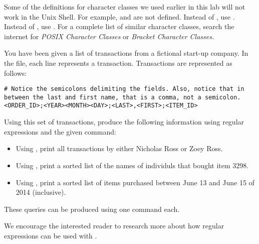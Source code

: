 \begin{warn}
Some of the definitions for character classes we used earlier in this lab will not work in the Unix Shell. For example, \li{\\w} and \li{\\d} are not defined. Instead of \li{\\w}, use \li{[[:alnum:]]}. Instead of \li{\\d}, use \li{[[:digit:]]}. For a complete list of similar character classes, search the internet for \emph{POSIX Character Classes} or \emph{Bracket Character Classes.}
\end{warn}

\begin{problem}
You have been given a list of transactions from a fictional start-up company. In the  file, each line represents a transaction. Transactions are represented as follows:
\begin{lstlisting}
# Notice the semicolons delimiting the fields. Also, notice that in between the last and first name, that is a comma, not a semicolon.
<ORDER_ID>;<YEAR><MONTH><DAY>;<LAST>,<FIRST>;<ITEM_ID>
\end{lstlisting}

Using this set of transactions, produce the following information using regular expressions and the given command:
\begin{itemize}
    \item Using , print all transactions by either Nicholas Ross or Zoey Ross.
    \item Using , print a sorted list of the names of individuls that bought item $3298$.
    \item Using , print a sorted list of items purchased between June 13 and June 15 of 2014 (inclusive).
\end{itemize}
These queries can be produced using one command each.
\end{problem}

We encourage the interested reader to research more about how regular expressions can be used with .

